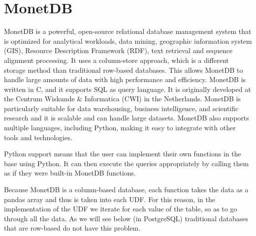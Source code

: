 \section{MonetDB}
\label{sec:monet}


MonetDB is a powerful, open-source relational database management system that is optimized for analytical workloads, data mining, 
geographic information system (GIS), Resource Description Framework (RDF), text retrieval and sequence alignment processing. 
It uses a column-store approach, which is a different storage method than traditional row-based databases. 
This allows MonetDB to handle large amounts of data with high performance and efficiency. 
MonetDB is written in C, and it supports SQL as query language. It is originally developed at the Centrum Wiskunde \& Informatica (CWI) in the Netherlands.
MonetDB is particularly suitable for data warehousing, business intelligence, and scientific research and it is scalable and can handle large datasets. 
MonetDB also supports multiple languages, including Python, making it easy to integrate with other tools and technologies.

Python support means that the user can implement their own functions in the base using Python. 
It can then execute the queries appropriately by calling them as if they were built-in MonetDB functions.

Because MonetDB is a column-based database, each function takes the data as a pandas array and thus is taken into each UDF. For this reason, in the implementation of the UDF we iterate for each value of the table, so as to go through all the data. As we will see below (in PostgreSQL) traditional databases that are row-based do not have this problem.
